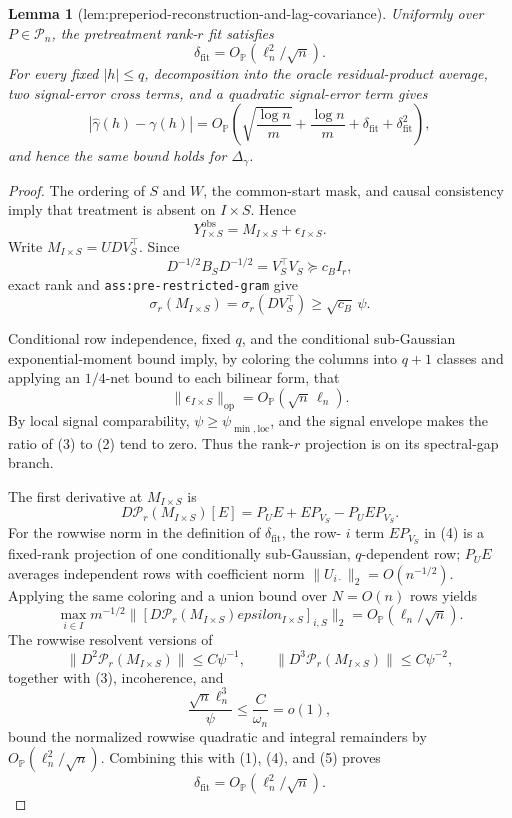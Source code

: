 \documentclass{article}
\newtheorem{lemma}{Lemma}
\begin{document}
\begin{lemma}[lem:preperiod-reconstruction-and-lag-covariance]\label{lem:preperiod-reconstruction-and-lag-covariance}
Uniformly over \(P\in\mathcal P_n\), the pretreatment rank-\(r\) fit satisfies
\[
 \delta_{\mathrm{fit}}=O_{\mathbb P}(\ell_n^2/\sqrt n).
\]
For every fixed \(|h|\le q\), decomposition into the oracle residual-product average, two signal-error cross terms, and a quadratic signal-error term gives
\[
 |\widehat\gamma(h)-\gamma(h)|
 =O_{\mathbb P}\!\left(
 \sqrt{\frac{\log n}{m}}+\frac{\log n}{m}
 +\delta_{\mathrm{fit}}+\delta_{\mathrm{fit}}^2\right),
\]
and hence the same bound holds for \(\Delta_\gamma\).
\end{lemma}
\begin{proof}
The ordering of \(S\) and \(W\), the common-start mask, and causal consistency imply that treatment is absent on \(I\times S\).  Hence
\[
 Y^{\mathrm{obs}}_{I\times S}=M_{I\times S}+\epsilon_{I\times S}.
 \tag{1}
\]
Write \(M_{I\times S}=UDV_S^{\top}\).  Since
\[
 D^{-1/2}B_SD^{-1/2}=V_S^{\top}V_S\succeq c_BI_r,
\]
exact rank and \texttt{ass:pre-restricted-gram} give
\[
 \sigma_r(M_{I\times S})
 =\sigma_r(DV_S^{\top})\ge \sqrt{c_B}\,\psi.
 \tag{2}
\]

Conditional row independence, fixed \(q\), and the conditional sub-Gaussian exponential-moment bound imply, by coloring the columns into \(q+1\) classes and applying an \(1/4\)-net bound to each bilinear form, that
\[
 \|\epsilon_{I\times S}\|_{\mathrm{op}}=O_{\mathbb P}(\sqrt n\,\ell_n).
 \tag{3}
\]
By local signal comparability, \(\psi\ge\psi_{\min,\mathrm{loc}}\), and the signal envelope makes the ratio of (3) to (2) tend to zero.  Thus the rank-\(r\) projection is on its spectral-gap branch.

The first derivative at \(M_{I\times S}\) is
\[
 D\mathcal P_r(M_{I\times S})[E]
 =P_UE+EP_{V_S}-P_UEP_{V_S}.
 \tag{4}
\]
For the rowwise norm in the definition of \(\delta_{\mathrm{fit}}\), the row-
\(i\) term \(EP_{V_S}\) in (4) is a fixed-rank projection of one conditionally sub-Gaussian, \(q\)-dependent row; \(P_UE\) averages independent rows with coefficient norm \(\|U_{i\cdot}\|_2=O(n^{-1/2})\).  Applying the same coloring and a union bound over \(N=O(n)\) rows yields
\[
 \max_{i\in I}m^{-1/2}
 \|[D\mathcal P_r(M_{I\times S})epsilon_{I\times S}]_{i,S}\|_2
 =O_{\mathbb P}(\ell_n/\sqrt n).
 \tag{5}
\]
The rowwise resolvent versions of
\[
 \|D^2\mathcal P_r(M_{I\times S})\|\le C\psi^{-1},
 \qquad
 \|D^3\mathcal P_r(M_{I\times S})\|\le C\psi^{-2},
\]
together with (3), incoherence, and
\[
 \frac{\sqrt n\ell_n^3}{\psi}
 \le\frac{C}{\omega_n}=o(1),
 \tag{6}
\]
bound the normalized rowwise quadratic and integral remainders by \(O_{\mathbb P}(\ell_n^2/\sqrt n)\).  Combining this with (1), (4), and (5) proves
\[
 \delta_{\mathrm{fit}}=O_{\mathbb P}(\ell_n^2/\sqrt n).
 \tag{7}
\]


\end{proof}
\end{document}
